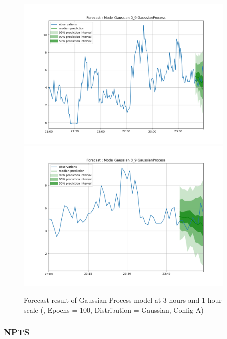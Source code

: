 \documentclass[a4paper, 12pt]{article}
\begin{document}
\begin{figure}[!h]
    \centering
    \includegraphics[width=400px]{plots/forecast/a/model/Gaussian/0_9/GaussianProcess/180.png}
    \includegraphics[width=400px]{plots/forecast/a/model/Gaussian/0_9/GaussianProcess/60.png}
    \caption{Forecast result of Gaussian Process model at 3 hours and 1 hour scale (, Epochs = 100, Distribution = Gaussian, Config A)}
    \label{fig:gp}
\end{figure}


\subsubsection{NPTS} \label{comp_npts}
\end{document}

